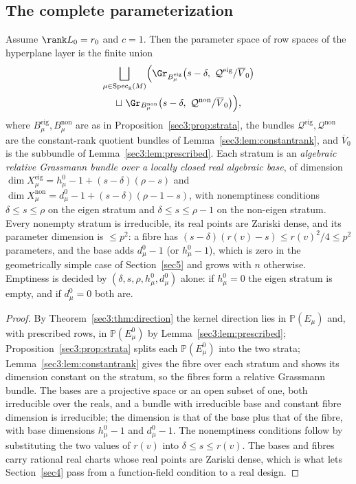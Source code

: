 \subsection{The complete parameterization}
\label{sec3:sub:param}
\begin{thm}
\label{sec3:thm:param}
\label{sec3:rem:empty}
\label{sec3:rem:dimension}
\label{sec3:rem:realpoints}
Assume $\rank L_0=r_0$ and $c=1$. Then the parameter space of row spaces of the hyperplane layer is
the finite union
\begin{gather*}
\bigsqcup_{\mu\in\operatorname{Spec}_{\mathbb{R}}(M)}
\Bigl(
\Gr_{B_\mu^{\mathrm{eig}}}\bigl(s-\delta,\ \mathcal{Q}^{\mathrm{eig}}/\overline{V}_0\bigr)
\\
\sqcup\ \Gr_{B_\mu^{\mathrm{non}}}\bigl(s-\delta,\ \mathcal{Q}^{\mathrm{non}}/\overline{V}_0\bigr)
\Bigr),
\end{gather*}
where $B_\mu^{\mathrm{eig}},B_\mu^{\mathrm{non}}$ are as in Proposition~\ref{sec3:prop:strata}, the
bundles $\mathcal{Q}^{\mathrm{eig}},\mathcal{Q}^{\mathrm{non}}$ are the constant-rank quotient bundles
of Lemma~\ref{sec3:lem:constantrank}, and $\overline{V}_0$ is the subbundle of
Lemma~\ref{sec3:lem:prescribed}. Each stratum is an \emph{algebraic relative Grassmann bundle over a
locally closed real algebraic base}, of dimension
$\dim X_\mu^{\mathrm{eig}}=h_\mu^0-1+(s-\delta)(\rho-s)$ and
$\dim X_\mu^{\mathrm{non}}=d_\mu^0-1+(s-\delta)(\rho-1-s)$, with nonemptiness conditions
$\delta\le s\le\rho$ on the eigen stratum and $\delta\le s\le\rho-1$ on the non-eigen stratum. Every
nonempty stratum is irreducible, its real points are Zariski dense, and its parameter dimension is
$\le p^2$: a fibre has $(s-\delta)(r(v)-s)\le r(v)^2/4\le p^2$ parameters, and the base adds $d_\mu^0-1$
(or $h_\mu^0-1$), which is zero in the geometrically simple case of Section~\ref{sec5} and grows with
$n$ otherwise. Emptiness is decided by $(\delta,s,\rho,h_\mu^0,d_\mu^0)$ alone: if $h_\mu^0=0$ the eigen
stratum is empty, and if $d_\mu^0=0$ both are.
\end{thm}
\begin{proof}
By Theorem~\ref{sec3:thm:direction} the kernel direction lies in $\mathbb{P}(E_\mu)$ and, with
prescribed rows, in $\mathbb{P}(E_\mu^0)$ by Lemma~\ref{sec3:lem:prescribed};
Proposition~\ref{sec3:prop:strata} splits each $\mathbb{P}(E_\mu^0)$ into the two strata;
Lemma~\ref{sec3:lem:constantrank} gives the fibre over each stratum and shows its dimension constant on
the stratum, so the fibres form a relative Grassmann bundle. The bases are a projective space or an open
subset of one, both irreducible over the reals, and a bundle with irreducible base and constant fibre
dimension is irreducible; the dimension is that of the base plus that of the fibre, with base
dimensions $h_\mu^0-1$ and $d_\mu^0-1$. The nonemptiness conditions follow by substituting the two
values of $r(v)$ into $\delta\le s\le r(v)$. The bases and fibres carry rational real charts whose real
points are Zariski dense, which is what lets Section~\ref{sec4} pass from a function-field condition to
a real design.
\end{proof}

